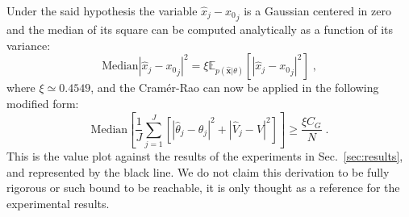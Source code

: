 \documentclass[aps, pra, 10pt, twocolumn, superscriptaddress,floatfix]{revtex4-1}
\begin{document}
Under the said hypothesis the variable $\hat{x}_j - {x_{0}}_j$ is a Gaussian centered in zero and the median of its square can be computed analytically as a function of its variance: 
%
\begin{equation}
	\text{Median} |\hat{x}_j-{x_0}_j|^2 = \xi \mathbb{E}_{p(\hat{\boldsymbol{x}}|\theta)} [ |\hat{x}_j-{x_0}_j|^2 ] \; ,
\end{equation}
%
where $\xi \simeq 0.4549$, and the Cramér-Rao can now be applied in the following modified form:
%
\begin{equation}
	\text{Median} \left[ \frac{1}{J} \sum_{j=1}^J  [|\hat{\theta}_j-\theta_j|^2 + |\hat{V}_j-V|^2] \right] \ge \frac{\xi C_G}{N} \; .
	\label{eq:medianCramer}
\end{equation}
%
This is the value plot against the results of the experiments in Sec.~\eqref{sec:results}, and represented by the black line. We do not claim this derivation to be fully rigorous or such bound to be reachable, it is only thought as a reference for the experimental results. 
\vspace{10pt}
\end{document}
